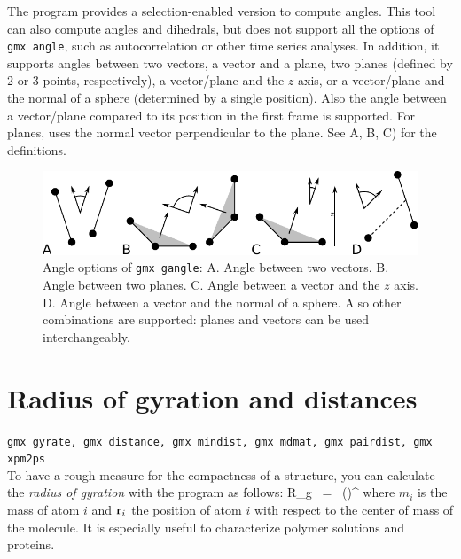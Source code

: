 The program {\tt {}} provides a selection-enabled
version to compute angles.  This tool can also compute angles and
dihedrals, but does not support all the options of {\tt gmx angle}, such
as autocorrelation or other time series analyses.
In addition, it supports angles between two vectors, a vector and a
plane, two planes (defined by 2 or 3 points, respectively), a
vector/plane and the $z$ axis, or a vector/plane and the normal of a
sphere (determined by a single position).
Also the angle between a vector/plane compared to its position in the
first frame is supported.
For planes, {\tt {}} uses the normal vector
perpendicular to the plane.
See A, B, C) for the definitions.

\begin{figure}
\centerline{
{\includegraphics{plots/sgangle}}}
\caption[Angle options of {\tt gmx gangle}.]{Angle options of {\tt gmx gangle}:
A. Angle between two vectors.
B. Angle between two planes.
C. Angle between a vector and the $z$ axis.
D. Angle between a vector and the normal of a sphere.
Also other combinations are supported: planes and vectors can be used
interchangeably.}
\label{fig:sgangle}
\end{figure}


\section{Radius of gyration and distances}
\label{sec:rg}
{\tt gmx gyrate, gmx distance, gmx mindist, gmx mdmat, gmx pairdist, gmx xpm2ps}\\
To have a rough measure for the compactness of a structure, you can calculate 
the {\em radius of gyration} with the program {\tt {}} as follows:
\beq
R_g ~=~ \left({}\right)^{\half}
\label{eqn:rg}
\eeq
where $m_i$ is the mass of atom $i$ and ${\bf r}_i$ the position of 
atom $i$ with respect to the center of mass of the molecule. It is especially 
useful to characterize polymer solutions and proteins.


